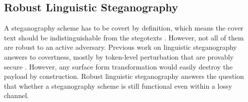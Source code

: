 




%
%

\subsection{Robust Linguistic Steganography}
A steganography scheme has to be covert by definition, which means the cover text should be indistinguishable from the stegotexts \citep{cachin2004information}.
However, not all of them are robust to an active adversary.
Previous work on linguistic steganography answers to covertness, mostly by token-level perturbation that are provably secure \citep{ziegler2019neural, kaptchuk2021meteor, de2022perfectly, ding2023discop}.
However, any surface form transformation would easily destroy the payload by construction.
Robust linguistic steganography answers the question that whether a steganography scheme is still functional even within a lossy channel.

